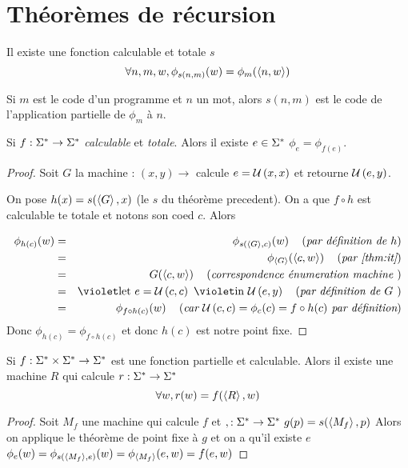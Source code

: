 \section{Théorèmes de récursion}


\begin{theorem}\label{thm:it}
	Il existe une fonction calculable et totale $s$ \tlq
	$$\forall n,m,w, \phi_{s(n,m)}(w) = \phi_m(\left\langle n,w\right\rangle)$$

	Si $m$ est le code d'un programme et $n$ un mot, alors $s(n,m)$ est le code de l'application partielle de $\phi_m$ à $n$.
\end{theorem}

\begin{theorem}
	Si $ f : \Sigma^{*} \to \Sigma^{*}$ \emph{calculable} et \emph {totale}. Alors il existe $e \in \Sigma^{*}$ \tq $\phi_e = \phi_{f(e)}$.
\end{theorem}


\begin{proof}
	Soit $G$ la machine : $(x,y) \to $ calcule $e = \mathcal U \left(x,x\right)$ et retourne $\mathcal U \left(e,y\right)$.

	On pose $h(x) = s(\left\langle G\right\rangle, x)$ (le $s$ du théorème precedent). On a que $f \circ h$ est calculable te totale et notons son coed $c$. Alors

	\begin{eqnarray*}
		\phi_{h(c)} (w) &=& \phi_{s(\encode G, c)} (w) \reason{par définition de $h$} \\
		&=& \phi_{\encode G} (\encode {c, w}) \reason{par \ref{thm:it}} \\
		&=& G (\encode {c, w}) \reason{correspondence énumeration machine }\\
		&=& \letin e {\universal c c} \universal e y \reason{par définition de $G$ }\\
		&=& \phi_{f \circ h (c)}(w) \reason{car $\universal c c = \phi_c(c) = f \circ h (c)$ par définition}
	\end{eqnarray*}
	Donc $\phi_{h(c)} = \phi_{f \circ h (c)}$ et donc $h(c)$ est notre point fixe.
\end{proof}


\begin{theorem}[de récursion]
	Si $f : \Sigma^{*} \times \Sigma^{*} \to \Sigma^{*}$ est une fonction partielle et calculable. Alors il existe une machine $R$ qui calcule $r : \Sigma^{*} \to \Sigma^{*} $ \tq
	$$ \forall w, r(w) =  f (\left\langle R\right\rangle, w)$$
\end{theorem}


\begin{proof}
	Soit $M_f$ une machine qui calcule $f$ et $, : \Sigma^{*} \to \Sigma^{*} \ g(p) = s(\left\langle M_f\right\rangle, p)$
	Alors on applique le théorème de point fixe à $g$ et on a qu'il existe $e$ \tq $\phi_e(w)
		=\phi_{s(\left\langle M_f\right\rangle,e)} (w) = \phi_{\left\langle M_f\right\rangle} (e,w) = f(e,w)$
\end{proof}
